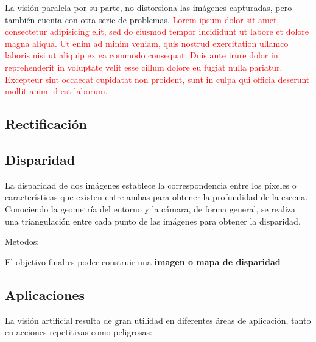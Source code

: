 La visión paralela por su parte, no distorsiona las imágenes capturadas, pero
también cuenta con otra serie de problemas. \textcolor{red}{Lorem ipsum dolor sit amet, consectetur adipisicing elit, sed do eiusmod tempor incididunt ut labore et dolore magna aliqua. Ut enim ad minim veniam, quis nostrud exercitation ullamco laboris nisi ut aliquip ex ea commodo consequat. Duis aute irure dolor in reprehenderit in voluptate velit esse cillum dolore eu fugiat nulla pariatur. Excepteur sint occaecat cupidatat non proident, sunt in culpa qui officia deserunt mollit anim id est laborum.}

\subsection{Rectificación}

\subsection{Disparidad}
La disparidad de dos imágenes establece la correspondencia entre los píxeles o
características que existen entre ambas para obtener la profundidad de la
escena. Conociendo la geometría del entorno y la cámara, de forma general, se
realiza una triangulación entre cada punto de las imágenes para obtener la
disparidad.

Metodos:


El objetivo final es poder construir una \textbf{imagen o mapa de disparidad}








\subsection{Aplicaciones}
La visión artificial resulta de gran utilidad en diferentes áreas de aplicación,
tanto en acciones repetitivas como peligrosas:

